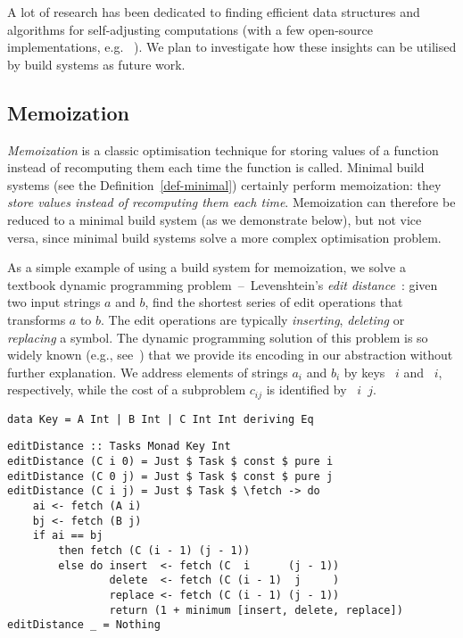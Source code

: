 A lot of research has been dedicated to finding efficient data structures and
algorithms for self-adjusting computations (with a few open-source
implementations, e.g. \Incremental~\cite{incremental}). We plan to investigate
how these insights can be utilised by build systems as future work.

\subsection{Memoization}\label{sec-related-memo}

\emph{Memoization} is a classic optimisation technique for storing values of a
function instead of recomputing them each time the function is called. Minimal
build systems (see the Definition~\ref{def-minimal}) certainly perform
memoization: they \emph{store values instead of recomputing them each time}.
Memoization can therefore be reduced to a minimal build system (as we
demonstrate below), but not vice versa, since minimal build systems solve a more
complex optimisation problem.

As a simple example of using a build system for memoization, we solve a textbook
dynamic programming problem~--~Levenshtein's \emph{edit
distance}~\cite{levenshtein1966binary}: given two input strings $a$ and
$b$, find the shortest series of edit operations that transforms $a$
to $b$. The edit operations are typically \emph{inserting}, \emph{deleting} or
\emph{replacing} a symbol. The dynamic programming solution of this problem is
so widely known (e.g., see~\cite{cormen2001introduction}) that we provide its
encoding in our  abstraction without further explanation.
We address elements of strings $a_i$ and $b_i$ by keys ~$i$ and ~$i$,
respectively, while the cost of a subproblem $c_{ij}$ is identified by
~$i$~$j$.

\begin{verbatim}
data Key = A Int | B Int | C Int Int deriving Eq
\end{verbatim}
\vspace{0mm}
\begin{verbatim}
editDistance :: Tasks Monad Key Int
editDistance (C i 0) = Just $ Task $ const $ pure i
editDistance (C 0 j) = Just $ Task $ const $ pure j
editDistance (C i j) = Just $ Task $ \fetch -> do
    ai <- fetch (A i)
    bj <- fetch (B j)
    if ai == bj
        then fetch (C (i - 1) (j - 1))
        else do insert  <- fetch (C  i      (j - 1))
                delete  <- fetch (C (i - 1)  j     )
                replace <- fetch (C (i - 1) (j - 1))
                return (1 + minimum [insert, delete, replace])
editDistance _ = Nothing
\end{verbatim}

